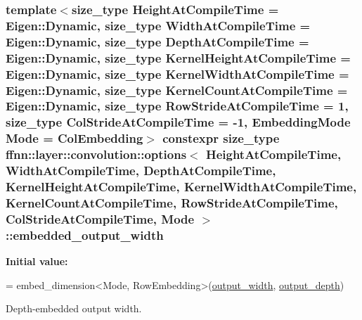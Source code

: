 \hypertarget{structffnn_1_1layer_1_1convolution_1_1options_a50aa15bb4c8e8b85748ad8485850e2ba}{
\subsubsection[{embedded\-\_\-output\-\_\-width}]{\setlength{\rightskip}{0pt plus 5cm}template$<$size\-\_\-type Height\-At\-Compile\-Time = Eigen\-::\-Dynamic, size\-\_\-type Width\-At\-Compile\-Time = Eigen\-::\-Dynamic, size\-\_\-type Depth\-At\-Compile\-Time = Eigen\-::\-Dynamic, size\-\_\-type Kernel\-Height\-At\-Compile\-Time = Eigen\-::\-Dynamic, size\-\_\-type Kernel\-Width\-At\-Compile\-Time = Eigen\-::\-Dynamic, size\-\_\-type Kernel\-Count\-At\-Compile\-Time = Eigen\-::\-Dynamic, size\-\_\-type Row\-Stride\-At\-Compile\-Time = 1, size\-\_\-type Col\-Stride\-At\-Compile\-Time = -\/1, Embedding\-Mode Mode = Col\-Embedding$>$ constexpr {\bf size\-\_\-type} {\bf ffnn\-::layer\-::convolution\-::options}$<$ Height\-At\-Compile\-Time, Width\-At\-Compile\-Time, Depth\-At\-Compile\-Time, Kernel\-Height\-At\-Compile\-Time, Kernel\-Width\-At\-Compile\-Time, Kernel\-Count\-At\-Compile\-Time, Row\-Stride\-At\-Compile\-Time, Col\-Stride\-At\-Compile\-Time, Mode $>$\-::embedded\-\_\-output\-\_\-width\hspace{0.3cm}{\ttfamily [static]}}}\label{structffnn_1_1layer_1_1convolution_1_1options_a50aa15bb4c8e8b85748ad8485850e2ba}
{\bfseries Initial value\-:}
\begin{DoxyCode}
=
    embed\_dimension<Mode, RowEmbedding>(\hyperlink{structffnn_1_1layer_1_1convolution_1_1options_a3d54e3e43cc0e955c4a64bcf6b5800d7}{output\_width}, \hyperlink{structffnn_1_1layer_1_1convolution_1_1options_a7efc40f0f1fccd6267ac93acd9c3fe05}{output\_depth})
\end{DoxyCode}


Depth-\/embedded output width. 

